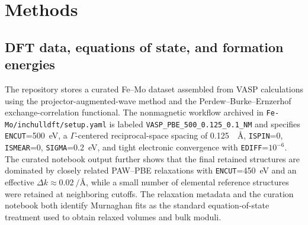 \section{Methods}
\label{sec:methods}

\subsection{DFT data, equations of state, and formation energies}

The repository stores a curated Fe--Mo dataset assembled from VASP calculations using the projector-augmented-wave method and the Perdew--Burke--Ernzerhof exchange-correlation functional. The nonmagnetic workflow archived in \texttt{Fe-Mo/inchulldft/setup.yaml} is labeled \texttt{VASP\_PBE\_500\_0.125\_0.1\_NM} and specifies \texttt{ENCUT}=\SI{500}{\electronvolt}, a $\Gamma$-centered reciprocal-space spacing of \SI{0.125}{\per\angstrom}, \texttt{ISPIN}=0, \texttt{ISMEAR}=0, \texttt{SIGMA}=\SI{0.2}{\electronvolt}, and tight electronic convergence with \texttt{EDIFF}=$10^{-6}$. The curated notebook output further shows that the final retained structures are dominated by closely related PAW--PBE relaxations with \texttt{ENCUT}=\SI{450}{\electronvolt} and an effective $\Delta k\approx\SI{0.02}{\per\angstrom}$, while a small number of elemental reference structures were retained at neighboring cutoffs. The relaxation metadata and the curation notebook both identify Murnaghan fits as the standard equation-of-state treatment used to obtain relaxed volumes and bulk moduli.\cite{KresseHafner1993,KresseFurthmueller1996CMS,KresseFurthmueller1996PRB,Perdew1996,Bloechl1994,KresseJoubert1999}

